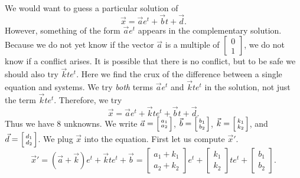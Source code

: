 \begin{exampleSol}
We would want to guess a particular solution of
\begin{equation*}
\vec{x} = 
\vec{a}
e^{t}
+
\vec{b}
t +
\vec{d} .
\end{equation*}
However, something of the form $\vec{a} e^t$ appears in the complementary
solution.  Because we do not yet know if the vector $\vec{a}$
is a multiple of $\left[ \begin{smallmatrix}
0 \\
1
\end{smallmatrix} \right]$, we do not know if a conflict
arises.  It is possible that there is no conflict,
but to be safe we should also try
$\vec{k} t e^t$.
Here we find
the crux of the difference between a single equation and systems.  We try
\emph{both} terms $\vec{a} e^t$ and $\vec{k} t e^t$ in the solution,
not just the term $\vec{k} t e^t$.
Therefore, we try
\begin{equation*}
\vec{x} = 
\vec{a}
e^{t}
+
\vec{k}
t
e^{t}
+
\vec{b}
t +
\vec{d}.
\end{equation*}
Thus we have 8 unknowns.  We write
$\vec{a} =
\Bigl[ \begin{smallmatrix} a_1 \\ a_2 \end{smallmatrix} \Bigr]$,
$\vec{b} =
\Bigl[ \begin{smallmatrix} b_1 \\ b_2 \end{smallmatrix} \Bigr]$,
$\vec{k} =
\Bigl[ \begin{smallmatrix} k_1 \\ k_2 \end{smallmatrix} \Bigr]$,
and
$\vec{d} =
\Bigl[ \begin{smallmatrix} d_1 \\ d_2 \end{smallmatrix} \Bigr]$.
We plug $\vec{x}$ into the equation.  First
let us compute ${\vec{x}}'$.
\begin{equation*}
{\vec{x}}' = 
\left( \vec{a} + \vec{k} \right)
e^{t}
+
\vec{k}
t
e^{t}
+
\vec{b} =
\begin{bmatrix}
a_1 + k_1 \\ a_2+k_2
\end{bmatrix}
e^{t}
+
\begin{bmatrix}
k_1 \\ k_2
\end{bmatrix}
t e^{t}
+
\begin{bmatrix}
b_1 \\ b_2
\end{bmatrix} .

\end{equation*}
\end{exampleSol}
